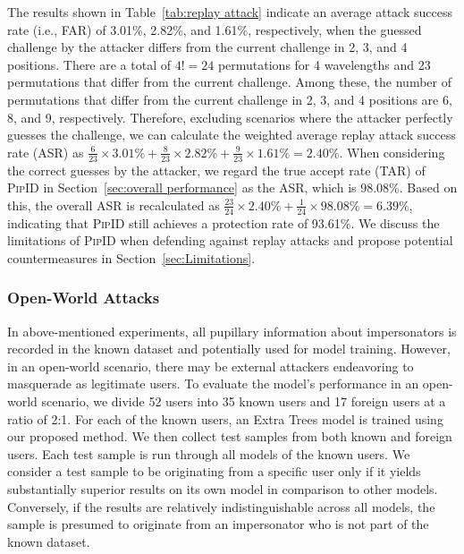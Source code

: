 \documentclass[sigconf]{acmart}
\newcommand{\sysname}{\textsc{PipID}\xspace}
\begin{document}
The results shown in Table~\ref{tab:replay attack} indicate an average attack success rate (i.e., FAR) of 3.01\%, 2.82\%, and 1.61\%, respectively, when the guessed challenge by the attacker differs from the current challenge in 2, 3, and 4 positions. There are a total of $4! = 24$ permutations for 4 wavelengths and 23 permutations that differ from the current challenge. Among these, the number of permutations that differ from the current challenge in 2, 3, and 4 positions are 6, 8, and 9, respectively. Therefore, excluding scenarios where the attacker perfectly guesses the challenge, we can calculate the weighted average replay attack success rate (ASR) as $\frac{6}{23} \times 3.01\% + \frac{8}{23} \times 2.82\% + \frac{9}{23} \times 1.61\% = 2.40\%$.
When considering the correct guesses by the attacker, we regard the true accept rate (TAR) of \sysname in Section~\ref{sec:overall performance} as the ASR, which is 98.08\%. Based on this, the overall ASR is recalculated as $\frac{23}{24} \times 2.40\% + \frac{1}{24} \times 98.08\% = 6.39\%$, indicating that \sysname still achieves a protection rate of 93.61\%. We discuss the limitations of \sysname when defending against replay attacks and propose potential countermeasures in Section~\ref{sec:Limitations}.

\subsubsection{Open-World Attacks}
In above-mentioned experiments, all pupillary information about impersonators is recorded in the known dataset and potentially used for model training. However, in an open-world scenario, there may be external attackers endeavoring to masquerade as legitimate users. To evaluate the model's performance in an open-world scenario, we divide 52 users into 35 known users and 17 foreign users at a ratio of 2:1. For each of the known users, an Extra Trees model is trained using our proposed method. We then collect test samples from both known and foreign users. Each test sample is run through all models of the known users. We consider a test sample to be originating from a specific user only if it yields substantially superior results on its own model in comparison to other models. Conversely, if the results are relatively indistinguishable across all models, the sample is presumed to originate from an impersonator who is not part of the known dataset.
\end{document}
